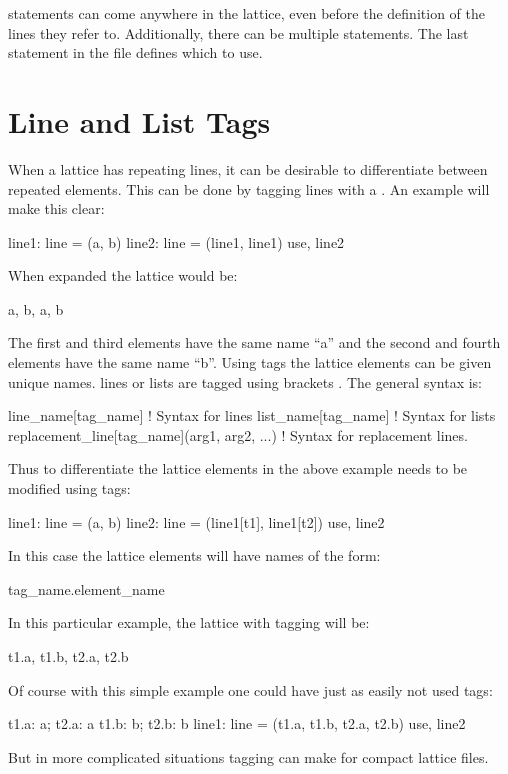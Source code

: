  statements can come anywhere in the lattice, even before the
definition of the lines they refer to. Additionally, there can be
multiple  statements.  The last  statement in the file
defines which  to use.

\section{Line and List Tags}
\label{s:tag}

When a lattice has repeating lines, it can be desirable to differentiate
between repeated elements. This can be done by tagging lines with a . 
An example will make this clear:
\begin{example}
  line1: line = (a, b)
  line2: line = (line1, line1)
  use, line2
\end{example}
When expanded the lattice would be:
\begin{example}
  a, b, a, b
\end{example}
The first and third elements have the same name ``a'' and the second and fourth
elements have the same name ``b''. Using tags the lattice elements can be given
unique names. lines or lists are tagged  
using brackets \vn{[...]}. The general syntax is:
\begin{example}
  line_name[tag_name]                           ! Syntax for lines
  list_name[tag_name]                           ! Syntax for lists
  replacement_line[tag_name](arg1, arg2, ...)   ! Syntax for replacement lines.
\end{example}
Thus to differentiate the lattice elements in the above example  needs to
be modified using tags:
\begin{example}
  line1: line = (a, b)
  line2: line = (line1[t1], line1[t2])
  use, line2
\end{example}
In this case the lattice elements will have names of the form:
\begin{example}
  tag_name.element_name
\end{example}
In this particular example, the lattice with tagging will be:
\begin{example}
  t1.a, t1.b, t2.a, t2.b
\end{example}
Of course with this simple example one could have just as easily not used tags:
\begin{example}
  t1.a: a;   t2.a: a
  t1.b: b;   t2.b: b
  line1: line = (t1.a, t1.b, t2.a, t2.b)
  use, line2
\end{example}
But in more complicated situations tagging can make for compact lattice files.

